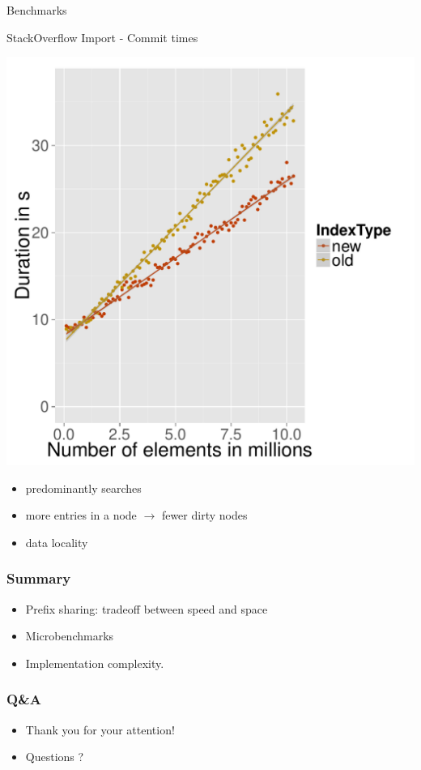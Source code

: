 \documentclass{beamer}
\begin{document}
\begin{section}{Benchmarks}
    \begin{frame}{StackOverflow Import - Commit times}
      \begin{minipage}{0.4\textwidth}
        \includegraphics[scale=0.32]{images/SO_commit_duration.pdf}
      \end{minipage}
      \quad
      \quad
      \quad
      \quad
      \begin{minipage}{0.4\textwidth}
        \begin{itemize}
          \item predominantly searches
          \item more entries in a node $\rightarrow$ fewer dirty nodes
          \item data locality
        \end{itemize}
      \end{minipage}

    \end{frame}
  \end{section}

  \begin{frame}
    \frametitle{Summary}
      \begin{itemize}
        \item Prefix sharing: tradeoff between speed and space
        \item Microbenchmarks
        \item Implementation complexity.
      \end{itemize}
  \end{frame}

  \begin{frame}
    \frametitle{Q\&A}
      \begin{itemize}
        \item Thank you for your attention!
        \item Questions ?
      \end{itemize}
  \end{frame}
\end{document}
